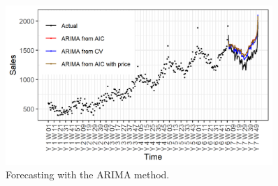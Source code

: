 \documentclass[12pt, letterpaper]{article}\usepackage[]{graphicx}\usepackage[]{color}
\begin{document}
\begin{figure}[h!]
\centering
\includegraphics[width = 0.9\textwidth]{"figures/arima.png"}
\caption{Forecasting with the ARIMA method.}
\label{fig:arima}
\end{figure}

\newpage
\end{document}
